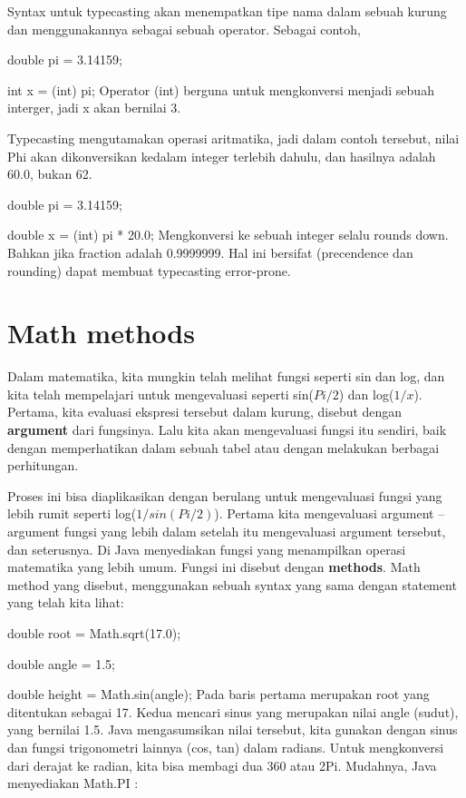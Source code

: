 Syntax untuk typecasting akan menempatkan tipe nama dalam sebuah kurung dan menggunakannya sebagai sebuah operator. Sebagai contoh,\newline

	double pi = 3.14159;

	int x = (int) pi;\newline\newline
Operator (int) berguna untuk mengkonversi menjadi sebuah interger, jadi x akan bernilai 3.

Typecasting mengutamakan operasi aritmatika, jadi dalam contoh tersebut, nilai Phi akan dikonversikan kedalam integer terlebih dahulu, dan hasilnya adalah 60.0, bukan 62.\newline

	double pi = 3.14159;
	
	double x = (int) pi * 20.0;\newline \newline
Mengkonversi ke sebuah integer selalu rounds down. Bahkan jika fraction adalah 0.9999999. Hal ini bersifat (precendence dan rounding) dapat membuat typecasting error-prone.

\section{Math methods}
Dalam matematika, kita mungkin telah melihat fungsi seperti sin dan log, dan kita telah mempelajari untuk mengevaluasi seperti sin($Pi/2$) dan log($1/x$). Pertama, kita evaluasi ekspresi tersebut dalam kurung, disebut dengan \textbf{argument} dari fungsinya. Lalu kita akan mengevaluasi fungsi itu sendiri, baik dengan memperhatikan dalam sebuah tabel atau dengan melakukan berbagai perhitungan.

Proses ini bisa diaplikasikan dengan berulang untuk mengevaluasi fungsi yang lebih rumit seperti log($1/ sin(Pi/2)$). Pertama kita mengevaluasi argument – argument fungsi yang lebih dalam setelah itu mengevaluasi argument tersebut, dan seterusnya.
Di Java menyediakan fungsi yang menampilkan operasi matematika yang lebih umum. Fungsi ini disebut dengan \textbf{methods}. Math method yang disebut, menggunakan sebuah syntax yang sama dengan statement yang telah kita lihat:\newline

	double root = Math.sqrt(17.0);
	
	double angle = 1.5;
	
	double height = Math.sin(angle);\newline \newline
Pada baris pertama merupakan root yang ditentukan sebagai 17. Kedua mencari  sinus yang merupakan nilai angle (sudut), yang bernilai 1.5. Java mengasumsikan nilai tersebut, kita gunakan dengan sinus dan fungsi trigonometri lainnya (cos, tan) dalam radians. Untuk mengkonversi dari derajat ke radian, kita bisa membagi dua 360 atau 2Pi. Mudahnya, Java menyediakan Math.PI :\newline

